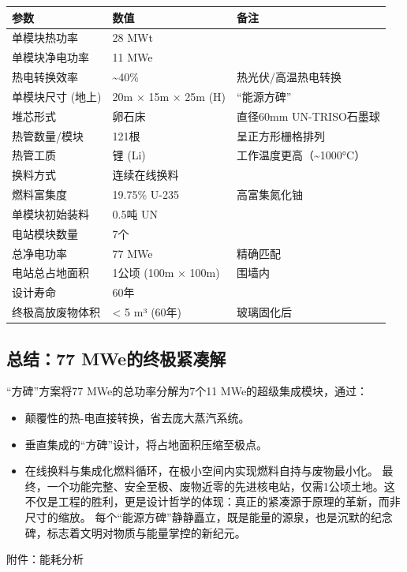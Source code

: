 {\def\LTcaptype{} %

\begin{longtable}[]{@{}lll@{}}
\toprule\noalign{}
参数 & 数值 & 备注 \\
\midrule\noalign{}
\endhead
\bottomrule\noalign{}
\endlastfoot
单模块热功率 & 28 MWt & \\
单模块净电功率 & 11 MWe & \\
热电转换效率 & \textasciitilde40\% & 热光伏/高温热电转换 \\
单模块尺寸 (地上) & 20m × 15m × 25m (H) & ``能源方碑'' \\
堆芯形式 & 卵石床 & 直径60mm UN-TRISO石墨球 \\
热管数量/模块 & 121根 & 呈正方形栅格排列 \\
热管工质 & 锂 (Li) & 工作温度更高（\textasciitilde1000°C） \\
换料方式 & 连续在线换料 & \\
燃料富集度 & 19.75\% U-235 & 高富集氮化铀 \\
单模块初始装料 & 0.5吨 UN & \\
电站模块数量 & 7个 & \\
总净电功率 & 77 MWe & 精确匹配 \\
电站总占地面积 & 1公顷 (100m × 100m) & 围墙内 \\
设计寿命 & 60年 & \\
终极高放废物体积 & \textless{} 5 m³ (60年) & 玻璃固化后 \\
\end{longtable}
}

\subsection{总结：77 MWe的终极紧凑解}\label{ux603bux7ed377-mweux7684ux7ec8ux6781ux7d27ux51d1ux89e3}

``方碑''方案将77 MWe的总功率分解为7个11 MWe的超级集成模块，通过：

\begin{itemize}
\item
  颠覆性的热-电直接转换，省去庞大蒸汽系统。
\item
  垂直集成的``方碑''设计，将占地面积压缩至极点。
\item
  在线换料与集成化燃料循环，在极小空间内实现燃料自持与废物最小化。
  最终，一个功能完整、安全至极、废物近零的先进核电站，仅需1公顷土地。这不仅是工程的胜利，更是设计哲学的体现：真正的紧凑源于原理的革新，而非尺寸的缩放。 每个``能源方碑''静静矗立，既是能量的源泉，也是沉默的纪念碑，标志着文明对物质与能量掌控的新纪元。
\end{itemize}

附件：能耗分析

